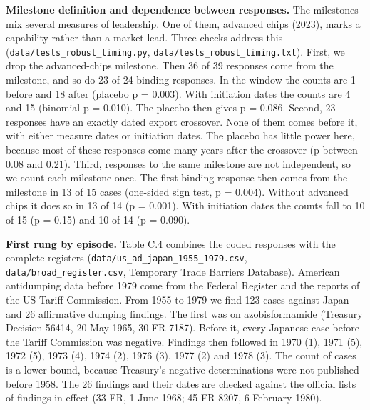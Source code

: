\textbf{Milestone definition and dependence between responses.} The
milestones mix several measures of leadership. One of them, advanced
chips (2023), marks a capability rather than a market lead. Three checks
address this (\texttt{data/\allowbreak{}tests\_\allowbreak{}robust\_\allowbreak{}timing.py},
\texttt{data/\allowbreak{}tests\_\allowbreak{}robust\_\allowbreak{}timing.txt}). First, we drop the
advanced-chips milestone. Then 36 of 39 responses come from the
milestone, and so do 23 of 24 binding responses. In the window the
counts are 1 before and 18 after (placebo p = 0.003). With initiation
dates the counts are 4 and 15 (binomial p = 0.010). The placebo then
gives p = 0.086. Second, 23 responses have an exactly dated export
crossover. None of them comes before it, with either measure dates or
initiation dates. The placebo has little power here, because most of
these responses come many years after the crossover (p between 0.08 and
0.21). Third, responses to the same milestone are not independent, so we
count each milestone once. The first binding response then comes from
the milestone in 13 of 15 cases (one-sided sign test, p = 0.004).
Without advanced chips it does so in 13 of 14 (p = 0.001). With
initiation dates the counts fall to 10 of 15 (p = 0.15) and 10 of 14 (p
= 0.090).

\textbf{First rung by episode.} Table C.4 combines the coded responses
with the complete registers
(\texttt{data/\allowbreak{}us\_\allowbreak{}ad\_\allowbreak{}japan\_\allowbreak{}1955\_\allowbreak{}1979.csv},
\texttt{data/\allowbreak{}broad\_\allowbreak{}register.csv}, Temporary Trade Barriers Database).
American antidumping data before 1979 come from the Federal Register and
the reports of the US Tariff Commission. From 1955 to 1979 we find 123
cases against Japan and 26 affirmative dumping findings. The first was
on azobisformamide (Treasury Decision 56414, 20 May 1965, 30 FR 7187).
Before it, every Japanese case before the Tariff Commission was
negative. Findings then followed in 1970 (1), 1971 (5), 1972 (5), 1973
(4), 1974 (2), 1976 (3), 1977 (2) and 1978 (3). The count of cases is a
lower bound, because Treasury's negative determinations were not
published before 1958. The 26 findings and their dates are checked
against the official lists of findings in effect (33 FR, 1 June 1968; 45
FR 8207, 6 February 1980).

